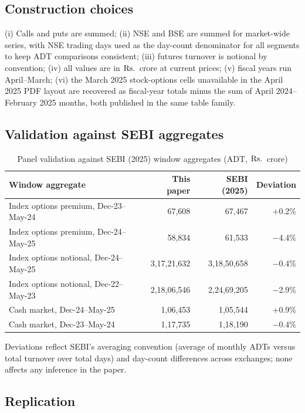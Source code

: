 \documentclass[12pt]{article}
\newcommand{\rupee}{\text{Rs.}\,}
\begin{document}
\subsection{Construction choices}

(i) Calls and puts are summed; (ii) NSE and BSE are summed for market-wide
series, with NSE trading days used as the day-count denominator for all
segments to keep ADT comparisons consistent; (iii) futures turnover is
notional by convention; (iv) all values are in \(\text{\rupee}\) crore at
current prices; (v) fiscal years run April--March; (vi) the March 2025
stock-options cells unavailable in the April 2025 PDF layout are recovered
as fiscal-year totals minus the sum of April 2024--February 2025 months,
both published in the same table family.

\subsection{Validation against SEBI aggregates}

\begin{table}[H]
\centering
\small
\caption{Panel validation against SEBI (2025) window aggregates (ADT, \(\text{\rupee}\) crore)}
\begin{tabular}{lrrr}
\toprule
Window aggregate & This paper & SEBI (2025) & Deviation \\
\midrule
Index options premium, Dec-23--May-24 & 67,608 & 67,467 & $+$0.2\% \\
Index options premium, Dec-24--May-25 & 58,834 & 61,533 & $-$4.4\% \\
Index options notional, Dec-24--May-25 & 3,17,21,632 & 3,18,50,658 & $-$0.4\% \\
Index options notional, Dec-22--May-23 & 2,18,06,546 & 2,24,69,205 & $-$2.9\% \\
Cash market, Dec-24--May-25 & 1,06,453 & 1,05,544 & $+$0.9\% \\
Cash market, Dec-23--May-24 & 1,17,735 & 1,18,190 & $-$0.4\% \\
\bottomrule
\end{tabular}
\end{table}

Deviations reflect SEBI's averaging convention (average of monthly ADTs
versus total turnover over total days) and day-count differences across
exchanges; none affects any inference in the paper.

\subsection{Replication}
\end{document}
